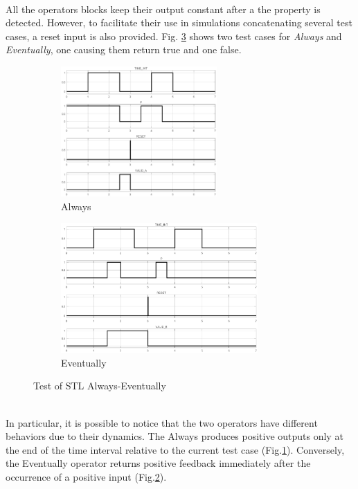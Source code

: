\paragraph{} All the operators blocks keep their output constant after a the property is detected. However,  to facilitate their use in simulations concatenating several test cases, a reset input is also provided. Fig. \ref{fig:testSTLALEV} shows two test cases for \textit{Always} and \textit{Eventually}, one causing them return true and one false. 
\begin{figure}[h]
    \centering
    \begin{subfigure}[b]{0.48\textwidth}
        	\includegraphics[width=\textwidth,height=188px]{Figs/testalw.eps}
        	\caption{Always}
            \label{fig:testalw}
    \end{subfigure}
        \begin{subfigure}[b]{.48\textwidth}
        	\includegraphics[width=\textwidth,height=188px]{Figs/testev.eps}
        	\caption{Eventually}
            \label{fig:testev}
        \end{subfigure}
    \caption{Test of STL Always-Eventually}
    \label{fig:testSTLALEV}
\end{figure}
\noindent
\\
In particular, it is possible to notice that the two operators have different behaviors due to their dynamics. The Always produces positive outputs only at the end of the time interval relative to the current test case  (Fig.\ref{fig:testalw}). Conversely, the Eventually operator returns positive feedback immediately after the occurrence of a positive input  (Fig.\ref{fig:testev}).
